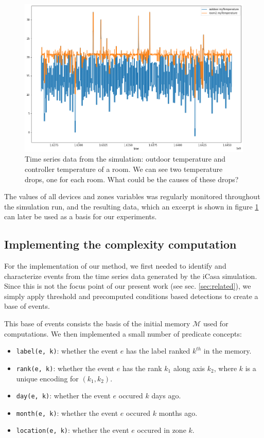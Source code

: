 \documentclass[conference]{IEEEtran}
\begin{document}
\begin{figure}[ht]
  \includegraphics[width=\linewidth]{figures/ts_example}
  \caption{Time series data from the simulation: outdoor temperature and
    controller temperature of a room. We can see two temperature drops, one for
    each room. What could be the causes of these drops?}
  \label{fig:ts_example}
\end{figure}

The values of all devices and zones variables was regularly monitored throughout
the simulation run, and the resulting data, which an excerpt is shown in figure
\ref{fig:ts_example} can later be used as a basis for our experiments.


\subsection{Implementing the complexity computation}

For the implementation of our method, we first needed to identify and
characterize events from the time series data generated by the iCasa simulation.
Since this is not the focus point of our present work (see sec.
\ref{sec:related}), we simply apply threshold and precomputed conditions based
detections to create a base of events.

This base of events consists the basis of the initial memory $\mathcal{M}$ used
for computations.
We then implemented a small number of predicate concepts:
\begin{itemize}
        \item \texttt{label(e, k)}: whether the event $e$ has the label ranked
        $k^{th}$ in the memory.
        \item \texttt{rank(e, k)}: whether the event $e$ has the rank $k_{1}$
        along axis $k_{2}$, where $k$ is a unique encoding for $(k_{1}, k_{2})$.
        \item \texttt{day(e, k)}: whether the event $e$ occured $k$ days ago.
        \item \texttt{month(e, k)}: whether the event $e$ occured $k$ months
        ago.
        \item \texttt{location(e, k)}: whether the event $e$ occured in zone
        $k$.
\end{itemize}
\end{document}
